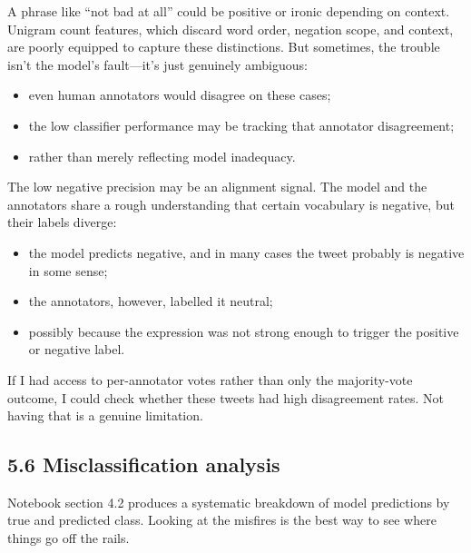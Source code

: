 \documentclass[12pt]{article}
\begin{document}
A phrase like ``not bad at all'' could be positive or ironic depending on context. Unigram count features, which discard word order, negation scope, and context, are poorly equipped to capture these distinctions. But sometimes, the trouble isn't the model's fault---it's just genuinely ambiguous:

\begin{itemize}

  \item even human annotators would disagree on these cases;

  \item the low classifier performance may be tracking that annotator disagreement;

  \item rather than merely reflecting model inadequacy.

\end{itemize}

The low negative precision may be an alignment signal. The model and the annotators share a rough understanding that certain vocabulary is negative, but their labels diverge:

\begin{itemize}

  \item the model predicts negative, and in many cases the tweet probably is negative in some sense;

  \item the annotators, however, labelled it neutral;

  \item possibly because the expression was not strong enough to trigger the positive or negative label.

\end{itemize} If I had access to per-annotator votes rather than only the majority-vote outcome, I could check whether these tweets had high disagreement rates. Not having that is a genuine limitation.



\subsection*{5.6 Misclassification analysis}



Notebook section 4.2 produces a systematic breakdown of model predictions by true and predicted class. Looking at the misfires is the best way to see where things go off the rails.
\end{document}
